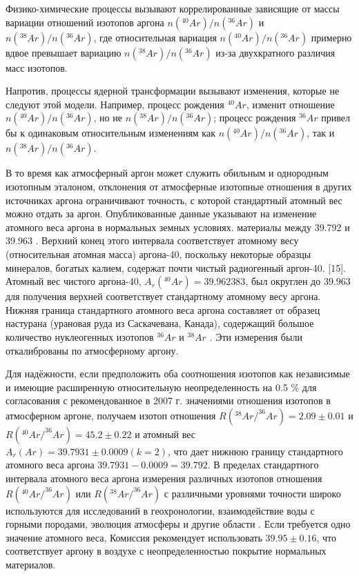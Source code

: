 \documentclass[a5paper,openany]{book}
\begin{document}
Физико-химические процессы вызывают
коррелированные зависящие от массы вариации отношений изотопов аргона $n(^{40}Ar)/n(^{36}Ar)$ и $n(^{38}Ar)/n(^{36}Ar)$,
где относительная вариация $n(^{40}Ar)/n(^{36}Ar)$ примерно вдвое превышает вариацию $n(^{38}Ar)/n(^{36}Ar)$ из-за
двухкратного различия масс изотопов. 

Напротив, процессы ядерной трансформации вызывают изменения, которые не следуют этой модели. Например, процесс рождения $^{40}Ar$, изменит отношение $n(^{40}Ar)/n(^{36}Ar)$, но не $n(^{38}Ar)/n(^{36}Ar)$; процесс рождения $^{36}Ar$ привел бы к одинаковым относительным изменениям как $n(^{40}Ar)/n(^{36}Ar)$, так и $n(^{38}Ar)/n(^{36}Ar)$.

В то время как атмосферный аргон может служить обильным и однородным изотопным эталоном, отклонения от
атмосферные изотопные отношения в других источниках аргона ограничивают точность, с которой стандартный атомный вес
можно отдать за аргон. Опубликованные данные указывают на изменение атомного веса аргона в нормальных земных условиях.
материалы между 39.792 и 39.963 \cite{IUPACArgon}. Верхний конец этого интервала соответствует атомному весу
(относительная атомная масса) аргона-40, поскольку некоторые образцы минералов, богатых калием, содержат почти чистый радиогенный аргон-40.
[15]. Атомный вес чистого аргона-40, $A_r(^{40}Ar) = 39.962 383$, был округлен до $39.963$ для получения верхней
соответствует стандартному атомному весу аргона. Нижняя граница стандартного атомного веса аргона составляет от
образец настурана (урановая руда из Саскачевана, Канада), содержащий большое количество нуклеогенных изотопов 
$^{36}Ar$ и $^{38}Ar$ \cite{Argon1993}. Эти измерения были откалиброваны по атмосферному аргону.

Для надёжности, если предположить
оба соотношения изотопов как независимые и имеющие расширенную относительную неопределенность на 0.5 \% для согласования с  рекомендованное в 2007 г. значениями отношения изотопов в атмосферном аргоне, получаем изотоп
отношения $R(^{38}Ar/^{36}Ar) = 2.09 \pm 0.01$ и $R(^{40}Ar/^{36}Ar) = 45.2 \pm 0.22$ и атомный вес
$A_r(Ar) = 39.7931 \pm 0.0009 (k = 2)$, что дает нижнюю границу стандартного атомного веса аргона $39.7931 - 0.0009 = 39.792$. В пределах стандартного интервала атомного веса аргона измерения различных изотопов
отношения $R(^{40}Ar/^{36}Ar)$ или $R(^{38}Ar/^{36}Ar)$ с различными уровнями точности широко используются для исследований в геохронологии,
взаимодействие воды с горными породами, эволюция атмосферы и другие области \cite{IUPACArgon}. Если требуется одно значение атомного веса,
Комиссия рекомендует использовать $39.95\pm 0.16$, что соответствует аргону в воздухе с неопределенностью покрытие нормальных материалов.
\end{document}
